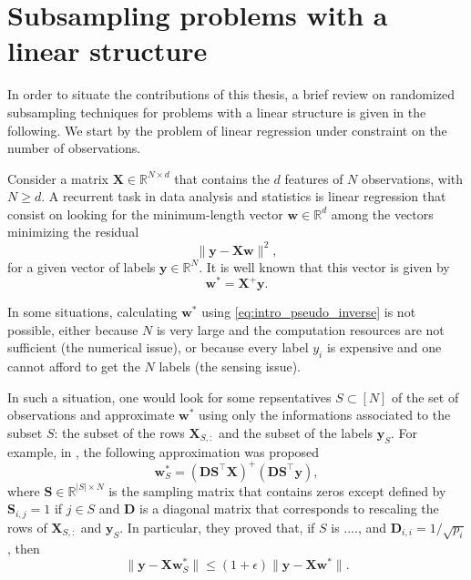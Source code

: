 \documentclass[twoside,11pt]{book}
\numberwithin{theorem}{chapter}
\numberwithin{definition}{chapter}
\numberwithin{proposition}{chapter}
\numberwithin{corollary}{chapter}
\numberwithin{example}{chapter}
\numberwithin{lemma}{chapter}
\numberwithin{assumption}{chapter}
\DeclareMathOperator{\Tran}{\intercal}
\begin{document}
\section{Subsampling problems with a linear structure}

In order to situate the contributions of this thesis, a brief review on randomized subsampling techniques for problems with a linear structure is given in the following. We start by the problem of linear regression under constraint on the number of observations.



Consider a matrix $\bm{X}\in \mathbb{R}^{N \times d}$ that contains the $d$ features of $N$ observations, with $N \geq d$. A recurrent task in data analysis and statistics is linear regression that consist on looking for the minimum-length vector $\bm{w} \in \mathbb{R}^{d}$ among the vectors minimizing the residual
\begin{equation}
\|\bm{y} - \bm{X}\bm{w}\|^{2},
\end{equation}
for a given vector of labels $\bm{y} \in \mathbb{R}^{N}$. It is well known that this vector is given by
\begin{equation}\label{eq:intro_pseudo_inverse}
\bm{w}^{*} = \bm{X}^{+}\bm{y}.
\end{equation}

In some situations, calculating $\bm{w}^{*}$ using \eqref{eq:intro_pseudo_inverse} is not possible, either because $N$ is very large and the computation resources are not sufficient (the numerical issue), or because every label $y_{i}$ is expensive and one cannot afford to get the $N$ labels (the sensing issue). 

In such a situation, one would look for some repsentatives $S \subset [N]$ of the set of observations and approximate $\bm{w}^{*}$ using only the informations associated to the subset $S$: the subset of the rows $\bm{X}_{S,:}$ and the subset of the labels $\bm{y}_{S}$. For example, in \citep*{DrMaMu06}, the following approximation was proposed
\begin{equation}
\bm{w}_{S}^{*} = (\bm{D}\bm{S}^{\Tran}\bm{X})^{+} (\bm{D}\bm{S}^{\Tran}\bm{y}),
\end{equation}
where $\bm{S} \in \mathbb{R}^{|S| \times N}$ is the sampling matrix that contains zeros except defined by $\bm{S}_{i,j} = 1$ if $j \in S$ and  $\bm{D}$ is a diagonal matrix that corresponds to rescaling the rows of $\bm{X}_{S,:}$ and $\bm{y}_{S}$. In particular, they proved that, if $S$ is ...., and $\bm{D}_{i,i} = 1/\sqrt{p_{i}}$, then 
\begin{equation}
\|\bm{y}- \bm{X}\bm{w}_{S}^{*} \| \leq (1+\epsilon) \|\bm{y}- \bm{X}\bm{w}^{*} \|.
\end{equation}
\end{document}
